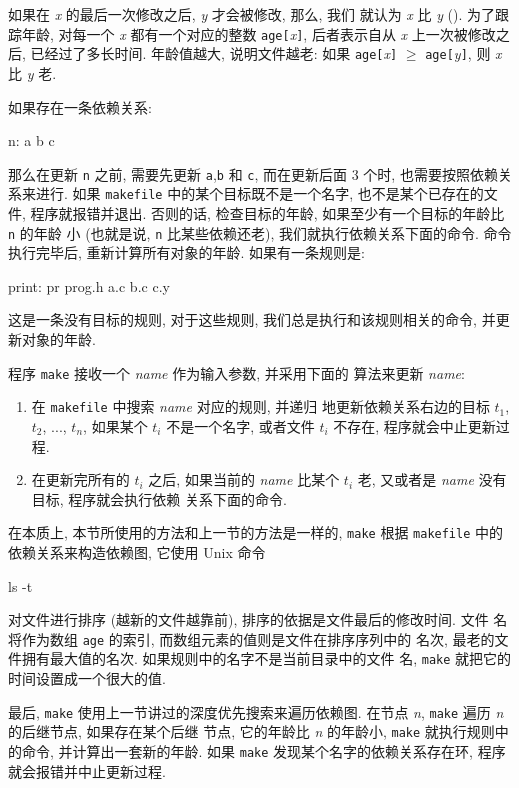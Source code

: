 如果在 \textit{x} 的最后一次修改之后, \textit{y} 才会被修改, 那么, 我们 
就认为 \textit{x} 比 \textit{y}  (). 为了跟踪年龄,
对每一个 \textit{x} 都有一个对应的整数 \texttt{age[}\textit{x}\texttt{]},
后者表示自从 \textit{x} 上一次被修改之后, 已经过了多长时间. 年龄值越大,
说明文件越老: 如果 \texttt{age[}\textit{x}\texttt{]} $\geqslant$ 
\texttt{age[}\textit{y}\texttt{]}, 则 \textit{x} 比 \textit{y} 老.

如果存在一条依赖关系:
\begin{shell}
    n: a b c
\end{shell}
那么在更新 \texttt{n} 之前, 需要先更新 \texttt{a},\texttt{b} 和 \texttt{c},
而在更新后面 3 个时, 也需要按照依赖关系来进行. 如果 \texttt{makefile}
中的某个目标既不是一个名字, 也不是某个已存在的文件, 程序就报错并退出.
否则的话, 检查目标的年龄, 如果至少有一个目标的年龄比 \texttt{n} 的年龄
小 (也就是说, \texttt{n} 比某些依赖还老), 我们就执行依赖关系下面的命令.
命令执行完毕后, 重新计算所有对象的年龄. 如果有一条规则是:
\begin{shell}
    print:
                pr prog.h a.c b.c c.y
\end{shell}
这是一条没有目标的规则, 对于这些规则, 我们总是执行和该规则相关的命令,
并更新对象的年龄.

程序 \texttt{make} 接收一个 \textit{name} 作为输入参数, 并采用下面的
算法来更新 \textit{name}:
\begin{enumerate}
    \item 
        在 \texttt{makefile} 中搜索 \textit{name} 对应的规则, 并递归
        地更新依赖关系右边的目标 $t_1$, $t_2$, ..., $t_n$, 如果某个 
        $t_i$ 不是一个名字, 或者文件 $t_i$ 不存在, 程序就会中止更新过程.
    \item 
        在更新完所有的 $t_i$ 之后, 如果当前的 \textit{name} 比某个
        $t_i$ 老, 又或者是 \textit{name} 没有目标, 程序就会执行依赖
        关系下面的命令.
\end{enumerate}

在本质上, 本节所使用的方法和上一节的方法是一样的, \texttt{make} 根据
\texttt{makefile} 中的依赖关系来构造依赖图, 它使用 Unix 命令 
\begin{shell}
    ls -t
\end{shell}
对文件进行排序 (越新的文件越靠前), 排序的依据是文件最后的修改时间. 文件 
名将作为数组 \texttt{age} 的索引, 而数组元素的值则是文件在排序序列中的
名次, 最老的文件拥有最大值的名次. 如果规则中的名字不是当前目录中的文件
名, \texttt{make} 就把它的时间设置成一个很大的值.

最后, \texttt{make} 使用上一节讲过的深度优先搜索来遍历依赖图. 在节点
\textit{n}, \texttt{make} 遍历 \textit{n} 的后继节点, 如果存在某个后继
节点, 它的年龄比 \textit{n} 的年龄小, \texttt{make} 就执行规则中的命令,
并计算出一套新的年龄. 如果 \texttt{make} 发现某个名字的依赖关系存在环,
程序就会报错并中止更新过程.

